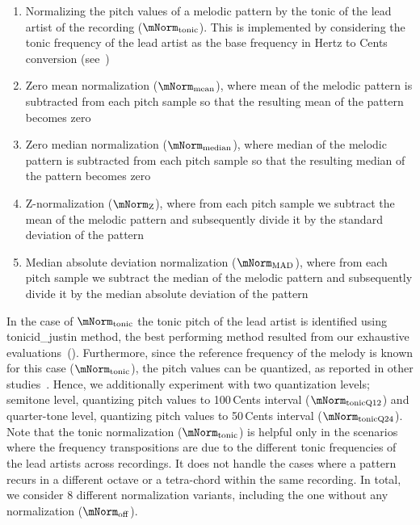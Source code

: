\begin{enumerate}
	\item Normalizing the pitch values of a melodic pattern by the tonic of the lead artist of the recording ($\mNorm_{\mathrm{tonic}}$). This is implemented by considering the tonic frequency of the lead artist as the base frequency in Hertz to Cents conversion (see~)

	\item Zero mean normalization ($\mNorm_{\mathrm{mean}}$), where mean of the melodic pattern is subtracted from each pitch sample so that the resulting mean of the pattern becomes zero
	
	\item Zero median normalization ($\mNorm_{\mathrm{median}}$), where median of the melodic pattern is subtracted from each pitch sample so that the resulting median of the pattern becomes zero
	\item Z-normalization ($\mNorm_{\mathrm{Z}}$), where from each pitch sample we subtract the mean of the melodic pattern and subsequently divide it by the standard deviation of the pattern
	\item Median absolute deviation normalization ($\mNorm_{\mathrm{MAD}}$), where from each pitch sample we subtract the median of the melodic pattern and subsequently divide it by the median absolute deviation of the pattern
\end{enumerate}

In the case of $\mNorm_{\mathrm{tonic}}$ the tonic pitch of the lead artist is identified using \acrshort{tonicid_justin} method, the best performing method resulted from our exhaustive evaluations~(). Furthermore, since the reference frequency of the melody is known for this case ($\mNorm_{\mathrm{tonic}}$), the pitch values can be quantized, as reported in other studies~\cite{Ross2012b}. Hence, we additionally experiment with two quantization levels; semitone level, quantizing pitch values to 100\,Cents interval ($\mNorm_{\mathrm{tonicQ12}}$) and quarter-tone level,  quantizing pitch values to 50\,Cents interval ($\mNorm_{\mathrm{tonicQ24}}$). Note that the tonic normalization ($\mNorm_{\mathrm{tonic}}$) is helpful only in the scenarios where the frequency transpositions are due to the different tonic frequencies of the lead artists across recordings. It does not handle the cases where a pattern recurs in a different octave or a tetra-chord within the same recording. In total, we consider 8 different normalization variants, including the one without any normalization ($\mNorm_{\mathrm{off}}$). 


